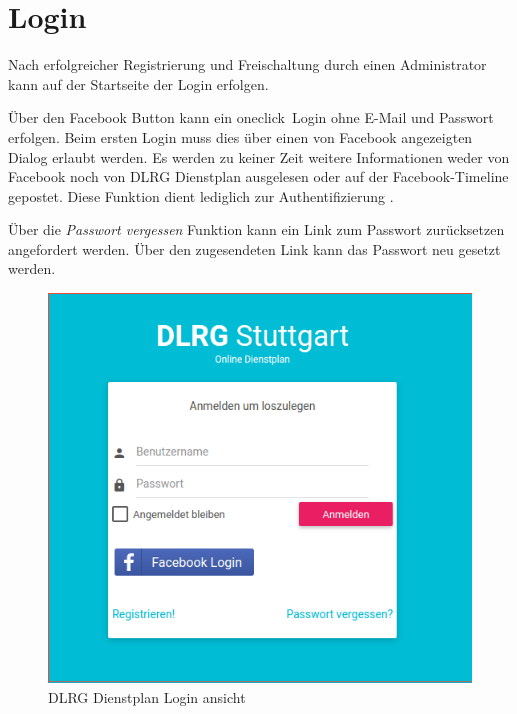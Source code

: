 \chapter{Login}
\label{cha:login}

Nach erfolgreicher Registrierung und Freischaltung durch einen Administrator kann auf der Startseite der Login erfolgen. 

\noindent Über den Facebook Button kann ein \glqq oneclick\grqq ~Login ohne E-Mail und Passwort erfolgen. Beim ersten Login muss dies über einen von Facebook angezeigten Dialog erlaubt werden. Es werden zu keiner Zeit weitere Informationen weder von Facebook noch von DLRG Dienstplan ausgelesen oder auf der Facebook-Timeline gepostet. Diese Funktion dient lediglich zur Authentifizierung \cite{Facebook_Login}.

\vspace*{5mm} \noindent Über die \textit{Passwort vergessen} Funktion kann ein Link zum Passwort zurücksetzen angefordert werden. Über den zugesendeten Link kann das Passwort neu gesetzt werden.

\begin{figure}[h]
 \begin{addmargin}{-0.2\linewidth}
   \centering 
   \includegraphics[width=12cm]{Bilder/view_login.png}
 \end{addmargin} 
 \caption[Login ansicht]{DLRG Dienstplan Login ansicht}
 \label{fig:view_login}
\end{figure}